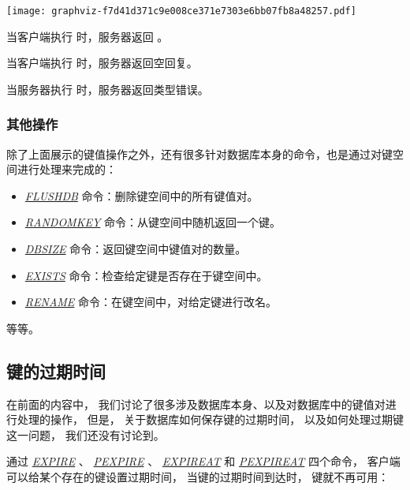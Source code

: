 \documentclass[a4paper,11pt,english]{sphinxmanual}
\begin{document}
\texttt{[image: graphviz-f7d41d371c9e008ce371e7303e6bb07fb8a48257.pdf]}

当客户端执行  时，服务器返回  。

当客户端执行  时，服务器返回空回复。

当服务器执行  时，服务器返回类型错误。


\subsubsection{其他操作}
\label{internal/db:id10}
除了上面展示的键值操作之外，还有很多针对数据库本身的命令，也是通过对键空间进行处理来完成的：
\begin{itemize}
\item {} 
\href{http://redis.readthedocs.org/en/latest/server/flushdb.html\#flushdb}{\emph{FLUSHDB}} 命令：删除键空间中的所有键值对。

\item {} 
\href{http://redis.readthedocs.org/en/latest/key/randomkey.html\#randomkey}{\emph{RANDOMKEY}} 命令：从键空间中随机返回一个键。

\item {} 
\href{http://redis.readthedocs.org/en/latest/server/dbsize.html\#dbsize}{\emph{DBSIZE}} 命令：返回键空间中键值对的数量。

\item {} 
\href{http://redis.readthedocs.org/en/latest/key/exists.html\#exists}{\emph{EXISTS}} 命令：检查给定键是否存在于键空间中。

\item {} 
\href{http://redis.readthedocs.org/en/latest/key/rename.html\#rename}{\emph{RENAME}} 命令：在键空间中，对给定键进行改名。

\end{itemize}

等等。


\subsection{键的过期时间}
\label{internal/db:id11}
在前面的内容中，
我们讨论了很多涉及数据库本身、以及对数据库中的键值对进行处理的操作，
但是，
关于数据库如何保存键的过期时间，
以及如何处理过期键这一问题，
我们还没有讨论到。

通过 \href{http://redis.readthedocs.org/en/latest/key/expire.html\#expire}{\emph{EXPIRE}} 、 \href{http://redis.readthedocs.org/en/latest/key/pexpire.html\#pexpire}{\emph{PEXPIRE}} 、 \href{http://redis.readthedocs.org/en/latest/key/expireat.html\#expireat}{\emph{EXPIREAT}} 和 \href{http://redis.readthedocs.org/en/latest/key/pexpireat.html\#pexpireat}{\emph{PEXPIREAT}} 四个命令，
客户端可以给某个存在的键设置过期时间，
当键的过期时间到达时，
键就不再可用：
\end{document}
